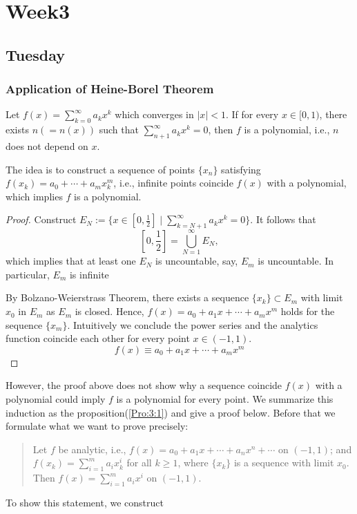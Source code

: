 
\chapter{Week3}

\section{Tuesday}
\subsection{Application of Heine-Borel Theorem}
\begin{theorem}
Let $f(x)=\sum_{k=0}^\infty a_kx^k$ which converges in $|x|<1$. If for every $x\in[0,1)$, there exists $n (=n(x))$ such that $\sum_{n+1}^\infty a_kx^k=0$, then $f$ is a polynomial, i.e., $n$ does not depend on $x$.
\end{theorem}
The idea is to construct a sequence of points $\{x_n\}$ satisfying $f(x_k) = a_0+\cdots+a_mx_k^m$, i.e., infinite points coincide $f(x)$ with a polynomial, which implies $f$ is a polynomial.
\begin{proof}
Construct $E_N:=\{x\in[0,\frac{1}{2}]\mid \sum_{k=N+1}^\infty a_kx^k=0\}$. It follows that
\[
[0,\frac{1}{2}] = \bigcup_{N=1}^\infty E_N,
\]
which implies that at least one $E_N$ is uncountable, say, $E_m$ is uncountable. In particular, $E_m$ is infinite

By Bolzano-Weierstrass Theorem, there exists a sequence $\{x_k\}\subset E_m$ with limit $x_0$ in $E_m$ as $E_m$ is closed. Hence, $f(x)=a_0+a_1x+\cdots+a_mx^m$ holds for the sequence $\{x_m\}$. Intuitively we conclude the power series and the analytics function coincide each other for every point $x\in(-1,1)$.
\[
f(x)\equiv a_0+a_1x+\cdots+a_mx^m
\]

\end{proof}
However, the proof above does not show why a sequence coincide $f(x)$ with a polynomial could imply $f$ is a polynomial for every point. We summarize this induction as the proposition(\ref{Pro:3:1}) and give a proof below. Before that we formulate what we want to prove precisely:
\begin{quotation}
Let $f$ be analytic, i.e., $f(x) = a_0+a_1x+\cdots+a_nx^n+\cdots$ on $(-1,1)$; and $f(x_k)=\sum_{i=1}^ma_ix_k^i$ for all $k\ge1$, where $\{x_k\}$ is a sequence with limit $x_0$. Then $f(x) = \sum_{i=1}^ma_ix^i$ on $(-1,1)$.
\end{quotation}
To show this statement, we construct
